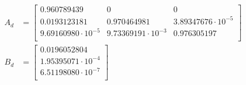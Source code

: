 \documentclass[12pt]{article}
\begin{document}
\begin{enumerate}
\begin{enumerate}
    \begin{align*}
        A_d &= \begin{bmatrix}
            0.960789439 & 0 & 0 \\
            0.0193123181 & 0.970464981 & 3.89347676\cdot10^{-5} \\
            9.69160980\cdot10^{-5} & 9.73369191\cdot10^{-3} & 0.976305197 \\
        \end{bmatrix} \\
        B_d &= \begin{bmatrix}
            0.0196052804 \\
            1.95395071\cdot10^{-4} \\
            6.51198080\cdot10^{-7} \\
        \end{bmatrix}
    \end{align*}
\end{enumerate}

\end{enumerate}
\end{document}
